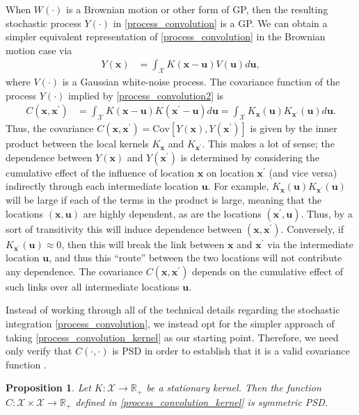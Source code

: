 \documentclass[12pt]{article}
\newcommand{\R}{\mathbb{R}}
\newcommand{\Cov}{\mathrm{Cov}}
\newcommand{\Ker}{K}
\newcommand{\covFun}{C}
\newcommand{\locSpace}{\mathcal{X}}
\newcommand{\loc}{\mathbf{x}}
\newcommand{\locTwo}{\loc^\prime}
\newcommand{\locDum}{\mathbf{u}}
\newcommand{\rf}{Y}
\newtheorem{prop}{Proposition}
\begin{document}
When $W(\cdot)$ is a Brownian motion or other form of GP, then the resulting stochastic process $\rf(\cdot)$ in \ref{process_convolution} is a 
GP. We can obtain a simpler equivalent representation of \ref{process_convolution} in the Brownian motion case via
\begin{align}
\rf(\loc) &= \int_{\locSpace} \Ker(\loc - \locDum) V(\locDum) d\locDum, \label{process_convolution2}
\end{align}
where $V(\cdot)$ is a Gaussian white-noise process. The covariance function of the process $\rf(\cdot)$ implied by \ref{process_convolution2} is 
\begin{align}
\covFun(\loc, \locTwo) &= \int_{\locSpace} \Ker(\loc - \locDum)\Ker(\locTwo - \locDum) d\locDum =  \int_{\locSpace} \Ker_{\loc}(\locDum)\Ker_{\locTwo}(\locDum) d\locDum. \label{process_convolution_kernel}
\end{align}
Thus, the covariance $\covFun(\loc, \locTwo) = \Cov[\rf(\loc), \rf(\locTwo)]$ is given by the inner product between the local kernels $\Ker_{\loc}$ and $\Ker_{\locTwo}$. 
This makes a lot of sense; the dependence between $\rf(\loc)$ and $\rf(\locTwo)$ is determined by considering the cumulative effect of the influence of location $\loc$ on location $\locTwo$ (and vice versa) 
indirectly through each intermediate location $\locDum$. For example, $\Ker_{\loc}(\locDum)\Ker_{\locTwo}(\locDum)$ will be large if each of the terms in the product is large, meaning that the locations 
$(\loc, \locDum)$ are highly dependent, as are the locations $(\locTwo, \locDum)$. Thus, by a sort of transitivity this will induce dependence between $(\loc, \locTwo)$. Conversely, if 
$\Ker_{\locTwo}(\locDum) \approx 0$, then this will break the link between $\loc$ and $\locTwo$ via the intermediate location $\locDum$, and thus this ``route'' between the two locations will not contribute 
any dependence. The covariance $\covFun(\loc, \locTwo)$ depends on the cumulative effect of such links over all intermediate locations $\locDum$. 

Instead of working through all of the technical details regarding the stochastic integration \ref{process_convolution}, we instead opt for the simpler approach of taking \ref{process_convolution_kernel}
as our starting point. Therefore, we need only verify that $\covFun(\cdot, \cdot)$ is PSD in order to establish that it is a valid covariance function \cite{Paciorek}. 

\begin{prop} 
Let $\Ker: \locSpace \to \R_+$ be a stationary kernel. Then the function $\covFun: \locSpace \times \locSpace \to \R_+$ defined in \ref{process_convolution_kernel} is symmetric PSD. 
\end{prop}
\end{document}
